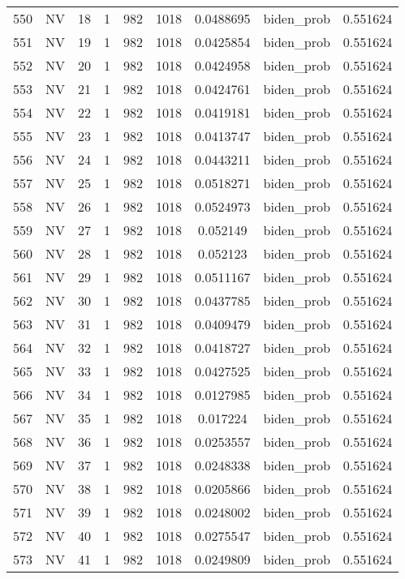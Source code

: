 \documentclass[12pt,a4paper]{article}
\begin{document}
\begin{tabular}{r|cccccccc}
	550 & NV & 18 & 1 & 982 & 1018 & 0.0488695 & biden\_prob & 0.551624 \\
	551 & NV & 19 & 1 & 982 & 1018 & 0.0425854 & biden\_prob & 0.551624 \\
	552 & NV & 20 & 1 & 982 & 1018 & 0.0424958 & biden\_prob & 0.551624 \\
	553 & NV & 21 & 1 & 982 & 1018 & 0.0424761 & biden\_prob & 0.551624 \\
	554 & NV & 22 & 1 & 982 & 1018 & 0.0419181 & biden\_prob & 0.551624 \\
	555 & NV & 23 & 1 & 982 & 1018 & 0.0413747 & biden\_prob & 0.551624 \\
	556 & NV & 24 & 1 & 982 & 1018 & 0.0443211 & biden\_prob & 0.551624 \\
	557 & NV & 25 & 1 & 982 & 1018 & 0.0518271 & biden\_prob & 0.551624 \\
	558 & NV & 26 & 1 & 982 & 1018 & 0.0524973 & biden\_prob & 0.551624 \\
	559 & NV & 27 & 1 & 982 & 1018 & 0.052149 & biden\_prob & 0.551624 \\
	560 & NV & 28 & 1 & 982 & 1018 & 0.052123 & biden\_prob & 0.551624 \\
	561 & NV & 29 & 1 & 982 & 1018 & 0.0511167 & biden\_prob & 0.551624 \\
	562 & NV & 30 & 1 & 982 & 1018 & 0.0437785 & biden\_prob & 0.551624 \\
	563 & NV & 31 & 1 & 982 & 1018 & 0.0409479 & biden\_prob & 0.551624 \\
	564 & NV & 32 & 1 & 982 & 1018 & 0.0418727 & biden\_prob & 0.551624 \\
	565 & NV & 33 & 1 & 982 & 1018 & 0.0427525 & biden\_prob & 0.551624 \\
	566 & NV & 34 & 1 & 982 & 1018 & 0.0127985 & biden\_prob & 0.551624 \\
	567 & NV & 35 & 1 & 982 & 1018 & 0.017224 & biden\_prob & 0.551624 \\
	568 & NV & 36 & 1 & 982 & 1018 & 0.0253557 & biden\_prob & 0.551624 \\
	569 & NV & 37 & 1 & 982 & 1018 & 0.0248338 & biden\_prob & 0.551624 \\
	570 & NV & 38 & 1 & 982 & 1018 & 0.0205866 & biden\_prob & 0.551624 \\
	571 & NV & 39 & 1 & 982 & 1018 & 0.0248002 & biden\_prob & 0.551624 \\
	572 & NV & 40 & 1 & 982 & 1018 & 0.0275547 & biden\_prob & 0.551624 \\
	573 & NV & 41 & 1 & 982 & 1018 & 0.0249809 & biden\_prob & 0.551624 \\

\end{tabular}
\end{document}
